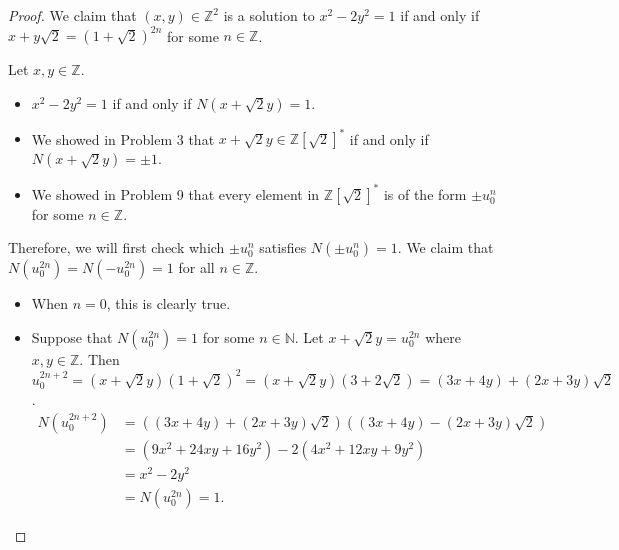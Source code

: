 \documentclass[12pt, psamsfonts]{amsart}
\theoremstyle{definition}
\theoremstyle{remark}
\numberwithin{equation}{section}
\begin{document}
\begin{proof}
  We claim that $(x, y) \in \mathbb{Z}^2$ is a solution to $x^2 - 2y^2 = 1$ if and only if $x + y\sqrt{2} = (1 + \sqrt{2})^{2n}$ for some $n \in \mathbb{Z}$.

  Let $x, y \in \mathbb{Z}$.
  \begin{itemize}
    \item
      $x^2 - 2y^2 = 1$ if and only if $N(x + \sqrt{2}y) = 1$.
    \item
      We showed in Problem 3 that $x + \sqrt{2}y \in \mathbb{Z}[\sqrt{2}]^*$ if and only if $N(x + \sqrt{2}y) = \pm 1$.
    \item
      We showed in Problem 9 that every element in $\mathbb{Z}[\sqrt{2}]^*$ is of the form $\pm u_0^n$ for some $n \in \mathbb{Z}$.
  \end{itemize}

  Therefore, we will first check which $\pm u_0^n$ satisfies $N(\pm u_0^n) = 1$.
  We claim that $N(u_0^{2n}) = N(-u_0^{2n}) = 1$ for all $n \in \mathbb{Z}$.
  \begin{itemize}
    \item
      When $n = 0$, this is clearly true.
    \item
      Suppose that $N(u_0^{2n}) = 1$ for some $n \in \mathbb{N}$.
      Let $x + \sqrt{2}y = u_0^{2n}$ where $x, y \in \mathbb{Z}$.
      Then $u_0^{2n + 2} = (x + \sqrt{2}y)(1 + \sqrt{2})^2 = (x + \sqrt{2}y)(3 + 2\sqrt{2}) = (3x + 4y) + (2x + 3y)\sqrt{2}$.
      \begin{align*}
        N(u_0^{2n + 2})
          &= ((3x + 4y) + (2x + 3y)\sqrt{2})((3x + 4y) - (2x + 3y)\sqrt{2}) \\
          &= (9x^2 + 24xy + 16y^2) - 2(4x^2 + 12xy + 9y^2) \\
          &= x^2 - 2y^2 \\
          &= N(u_0^{2n}) = 1.
      \end{align*}


\end{itemize}
\end{proof}
\end{document}
